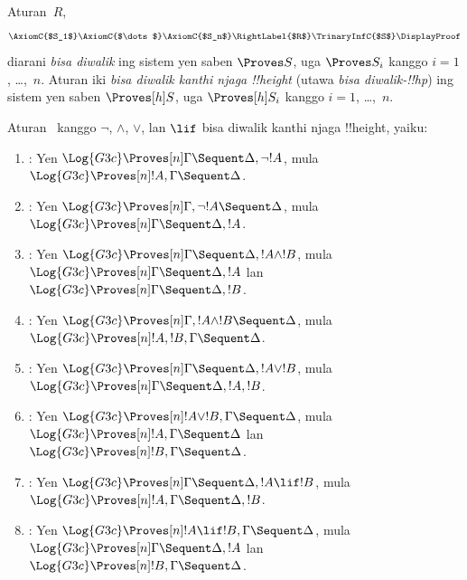 \documentclass[../../../include/open-logic-section]{subfiles}
\begin{document}


\begin{defn}
Aturan~$R$,
\[
\AxiomC{$S_1$}
\AxiomC{$\dots$}
\AxiomC{$S_n$}
\RightLabel{$R$}
\TrinaryInfC{$S$}
\DisplayProof
\]
diarani \emph{bisa diwalik} ing sistem yen saben $\Proves S$,
uga $\Proves S_i$ kanggo $i = 1$, \dots,~$n$.
Aturan iki \emph{bisa diwalik kanthi njaga !!{height}}
(utawa \emph{bisa diwalik-!!{hp}}) ing sistem yen saben
$\Proves[h] S$, uga $\Proves[h] S_i$ kanggo $i = 1$, \dots,~$n$.
\end{defn}

\begin{lem}
Aturan~ kanggo $\lnot$, $\land$, $\lor$, lan $\lif$
bisa diwalik kanthi njaga !!{height}, yaiku:
\begin{enumerate}
  \item \RightR{\lnot}: Yen $\Log{G3c} \Proves[n] \Gamma \Sequent
  \Delta, \lnot !A$, mula $\Log{G3c} \Proves[n] !A, \Gamma \Sequent
  \Delta$.
  \item \LeftR{\lnot}: Yen $\Log{G3c} \Proves[n] \Gamma, \lnot !A
  \Sequent \Delta$, mula $\Log{G3c} \Proves[n] \Gamma \Sequent \Delta,
  !A$.
  \item \RightR{\land}: Yen $\Log{G3c} \Proves[n] \Gamma \Sequent
  \Delta, !A \land !B$, mula $\Log{G3c} \Proves[n] \Gamma \Sequent
  \Delta, !A$ lan $\Log{G3c} \Proves[n] \Gamma \Sequent
  \Delta, !B$.
  \item \LeftR{\land}: Yen $\Log{G3c} \Proves[n] \Gamma, !A \land !B
  \Sequent \Delta$, mula $\Log{G3c} \Proves[n] !A, !B, \Gamma \Sequent
  \Delta$.
  \item \RightR{\lor}: Yen $\Log{G3c} \Proves[n] \Gamma \Sequent
  \Delta, !A \lor !B$, mula $\Log{G3c} \Proves[n] \Gamma \Sequent
  \Delta, !A, !B$.
  \item \LeftR{\lor}: Yen $\Log{G3c} \Proves[n] !A \lor !B, \Gamma \Sequent
  \Delta$, mula $\Log{G3c} \Proves[n] !A, \Gamma \Sequent
  \Delta$ lan $\Log{G3c} \Proves[n] !B, \Gamma \Sequent
  \Delta$.
  \item \RightR{\lif}: Yen $\Log{G3c} \Proves[n] \Gamma \Sequent
  \Delta, !A \lif !B$, mula $\Log{G3c} \Proves[n] !A, \Gamma \Sequent
  \Delta, !B$.
  \item \LeftR{\lif}: Yen $\Log{G3c} \Proves[n] !A \lif !B, \Gamma
  \Sequent \Delta$, mula $\Log{G3c} \Proves[n] \Gamma \Sequent \Delta,
  !A$ lan $\Log{G3c} \Proves[n] !B, \Gamma \Sequent \Delta$.
\end{enumerate}
\end{lem}
\end{document}
